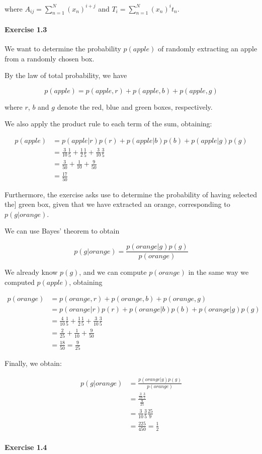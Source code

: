 where $A_{ij} = \sum_{n=1}^N (x_n)^{i+j}$ and $T_i = \sum_{n=1}^N (x_n)^it_n$.


\paragraph{Exercise 1.3}

We want to determine the probability $p(apple)$ of randomly extracting an apple from
a randomly chosen box.

By the law of total probability, we have

\begin{equation*}
    p(apple) = p(apple, r) + p(apple, b) + p(apple, g)
\end{equation*}

where $r$, $b$ and $g$ denote the red, blue and green boxes, respectively.

We also apply the product rule to each term of the sum, obtaining:

\begin{align*}
    p(apple) &= p(apple|r)p(r) + p(apple|b)p(b) + p(apple|g)p(g)\\
    &= \frac{3}{10}\frac{1}{5} + \frac{1}{2}\frac{1}{5} + \frac{3}{10}\frac{3}{5}\\
    &= \frac{3}{50} + \frac{1}{10} + \frac{9}{50}\\
    &= \frac{17}{50}
\end{align*}

Furthermore, the exercise asks use to determine the probability of having selected the]
green box, given that we have extracted an orange, corresponding to $p(g|orange)$.

We can use Bayes' theorem to obtain

\begin{equation*}
    p(g|orange) = \frac{p(orange|g)p(g)}{p(orange)}
\end{equation*}

We already know $p(g)$, and we can compute $p(orange)$ in the same way we computed $p(apple)$,
obtaining

\begin{align*}
    p(orange) &= p(orange, r) + p(orange, b) + p(orange, g)\\
    &= p(orange|r)p(r) + p(orange|b)p(b) + p(orange|g)p(g)\\
    &= \frac{4}{10}\frac{1}{5} + \frac{1}{2}\frac{1}{5} + \frac{3}{10}\frac{3}{5}\\
    &= \frac{2}{25} + \frac{1}{10} + \frac{9}{50}\\
    &= \frac{18}{50} = \frac{9}{25}
\end{align*}

Finally, we obtain:

\begin{align*}
    p(g|orange) &= \frac{p(orange|g)p(g)}{p(orange)}\\
    &= \frac{\frac{3}{10}\frac{3}{5}}{\frac{9}{25}}\\
    &= \frac{3}{10}\frac{3}{5}\frac{25}{9}\\
    &= \frac{225}{450} = \frac{1}{2}
\end{align*}

\paragraph{Exercise 1.4}